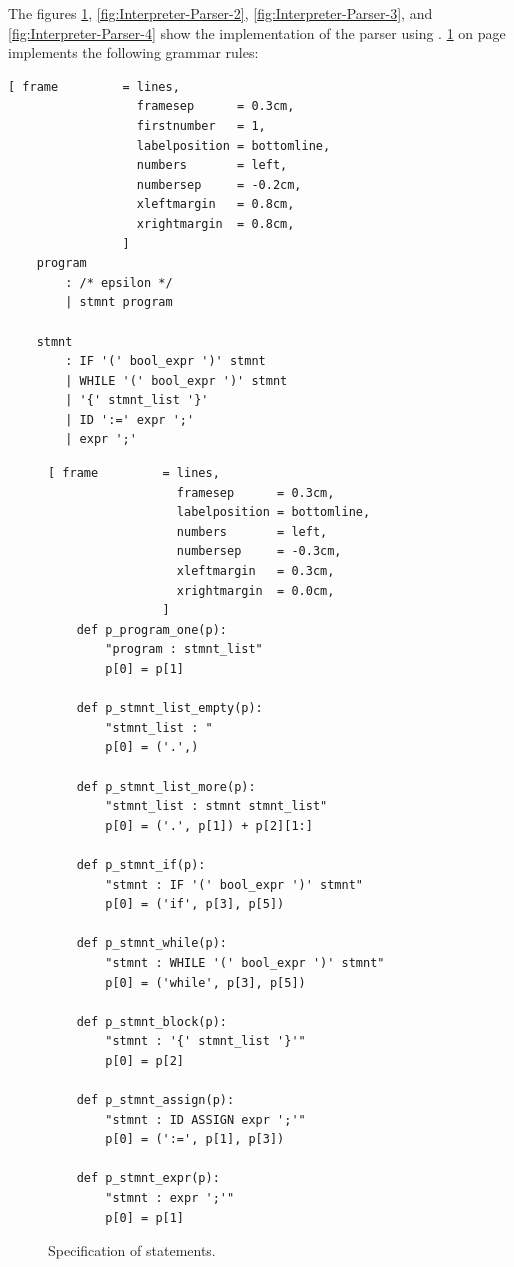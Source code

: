 \noindent
The figures \ref{fig:Interpreter-Parser-1}, \ref{fig:Interpreter-Parser-2}, \ref{fig:Interpreter-Parser-3}, and
\ref{fig:Interpreter-Parser-4} show the implementation of the parser using  .
\ref{fig:Interpreter-Parser-1} on page \pageref{fig:Interpreter-Parser-1} implements the following grammar rules:

\begin{Verbatim}[ frame         = lines, 
                  framesep      = 0.3cm, 
                  firstnumber   = 1,
                  labelposition = bottomline,
                  numbers       = left,
                  numbersep     = -0.2cm,
                  xleftmargin   = 0.8cm,
                  xrightmargin  = 0.8cm,
                ]
    program
        : /* epsilon */
        | stmnt program
        
    stmnt 
        : IF '(' bool_expr ')' stmnt                 
        | WHILE '(' bool_expr ')' stmnt
        | '{' stmnt_list '}' 
        | ID ':=' expr ';'  
        | expr ';'       
\end{Verbatim}



\begin{figure}[!ht]
\centering
\begin{Verbatim}[ frame         = lines, 
                  framesep      = 0.3cm, 
                  labelposition = bottomline,
                  numbers       = left,
                  numbersep     = -0.3cm,
                  xleftmargin   = 0.3cm,
                  xrightmargin  = 0.0cm,
                ]
    def p_program_one(p):
        "program : stmnt_list"
        p[0] = p[1]
    
    def p_stmnt_list_empty(p):
        "stmnt_list : "
        p[0] = ('.',)
    
    def p_stmnt_list_more(p):
        "stmnt_list : stmnt stmnt_list"
        p[0] = ('.', p[1]) + p[2][1:]
    
    def p_stmnt_if(p):
        "stmnt : IF '(' bool_expr ')' stmnt"
        p[0] = ('if', p[3], p[5])   
    
    def p_stmnt_while(p):
        "stmnt : WHILE '(' bool_expr ')' stmnt"
        p[0] = ('while', p[3], p[5])
        
    def p_stmnt_block(p):
        "stmnt : '{' stmnt_list '}'"
        p[0] = p[2]
        
    def p_stmnt_assign(p):
        "stmnt : ID ASSIGN expr ';'"
        p[0] = (':=', p[1], p[3])
       
    def p_stmnt_expr(p):
        "stmnt : expr ';'"
        p[0] = p[1]
\end{Verbatim}
\vspace*{-0.3cm} %
\caption{Specification of statements.}
\label{fig:Interpreter-Parser-1}
\end{figure}


